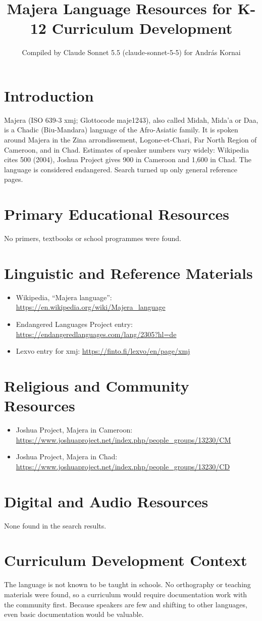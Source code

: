 \documentclass[12pt]{article}
\title{Majera Language Resources for K-12 Curriculum Development}
\author{Compiled by Claude Sonnet 5.5 (claude-sonnet-5-5) for Andr\'as Kornai}
\date{}
\begin{document}
\maketitle

\section{Introduction}
Majera (ISO 639-3 xmj; Glottocode maje1243), also called Midah, Mida'a or Daa, is a Chadic (Biu-Mandara) language of the Afro-Asiatic family. It is spoken around Majera in the Zina arrondissement, Logone-et-Chari, Far North Region of Cameroon, and in Chad. Estimates of speaker numbers vary widely: Wikipedia cites 500 (2004), Joshua Project gives 900 in Cameroon and 1,600 in Chad. The language is considered endangered. Search turned up only general reference pages.

\section{Primary Educational Resources}
No primers, textbooks or school programmes were found.

\section{Linguistic and Reference Materials}
\begin{itemize}
\item Wikipedia, ``Majera language'': \url{https://en.wikipedia.org/wiki/Majera_language}
\item Endangered Languages Project entry: \url{https://endangeredlanguages.com/lang/2305?hl=de}
\item Lexvo entry for xmj: \url{https://finto.fi/lexvo/en/page/xmj}
\end{itemize}

\section{Religious and Community Resources}
\begin{itemize}
\item Joshua Project, Majera in Cameroon: \url{https://www.joshuaproject.net/index.php/people_groups/13230/CM}
\item Joshua Project, Majera in Chad: \url{https://www.joshuaproject.net/index.php/people_groups/13230/CD}
\end{itemize}

\section{Digital and Audio Resources}
None found in the search results.

\section{Curriculum Development Context}
The language is not known to be taught in schools. No orthography or teaching materials were found, so a curriculum would require documentation work with the community first. Because speakers are few and shifting to other languages, even basic documentation would be valuable.
\end{document}
